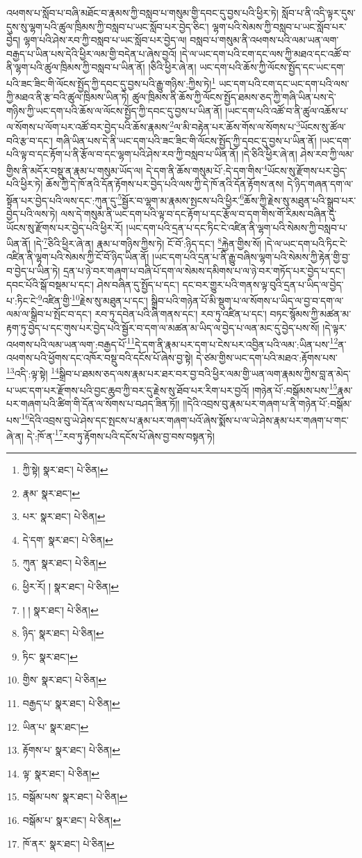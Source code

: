 འཕགས་པ་སློབ་པ་བཞི་མཐོང་བ་རྣམས་ཀྱི་བསླབ་པ་གསུམ་གྱི་དབང་དུ་བྱས་པའི་ཕྱིར་ཏེ། སློབ་པ་ནི་འདི་ལྟར་དུས་དུས་སུ་ལྷག་པའི་ཚུལ་ཁྲིམས་ཀྱི་བསླབ་པ་ཡང་སློབ་པར་བྱེད་ཅིང་། ལྷག་པའི་སེམས་ཀྱི་བསླབ་པ་ཡང་སློབ་པར་བྱེད། ལྷག་པའི་ཤེས་རབ་ཀྱི་བསླབ་པ་ཡང་སློབ་པར་བྱེད་ལ། བསླབ་པ་གསུམ་ནི་འཕགས་པའི་ལམ་ཡན་ལག་བརྒྱད་པ་ཡིན་པས་དེའི་ཕྱིར་ལམ་གྱི་བདེན་པ་ཞེས་བྱའོ། །དེ་ལ་ཡང་དག་པའི་ངག་དང་ལས་ཀྱི་མཐའ་དང་འཚོ་བ་ནི་ལྷག་པའི་ཚུལ་ཁྲིམས་ཀྱི་བསླབ་པ་ཡིན་ནོ། །ཅིའི་ཕྱིར་ཞེ་ན། ཡང་དག་པའི་ཆོས་ཀྱི་ལོངས་སྤྱོད་དང་ཡང་དག་པའི་ཟང་ཟིང་གི་ལོངས་སྤྱོད་ཀྱི་དབང་དུ་བྱས་པའི་རྒྱུ་གཉིས་:ཀྱིས་ཏེ།\footnote{ཀྱི་སྟེ།  སྣར་ཐང་།  པེ་ཅིན། } ཡང་དག་པའི་ངག་དང་ཡང་དག་པའི་ལས་ཀྱི་མཐའ་ནི་རྩ་བའི་ཚུལ་ཁྲིམས་ཡིན་ཏེ། ཚུལ་ཁྲིམས་ནི་ཆོས་ཀྱི་ལོངས་སྤྱོད་ཐམས་ཅད་ཀྱི་གཞི་ཡིན་པས་དེ་གཉིས་ཀྱི་ཡང་དག་པའི་ཆོས་ལ་ལོངས་སྤྱོད་ཀྱི་དབང་དུ་བྱས་པ་ཡིན་ནོ། །ཡང་དག་པའི་འཚོ་བ་ནི་ཚུལ་འཆོས་པ་ལ་སོགས་པ་ལོག་པར་འཚོ་བར་བྱེད་པའི་ཆོས་རྣམས་\footnote{རྣམ་  སྣར་ཐང་། }ལ་མི་བརྟེན་པར་ཆོས་གོས་ལ་སོགས་པ་\footnote{པར་  སྣར་ཐང་།  པེ་ཅིན། }ཡོངས་སུ་ཚོལ་བའི་རྩ་བ་དང་། གཞི་ཡིན་པས་དེ་ནི་ཡང་དག་པའི་ཟང་ཟིང་གི་ལོངས་སྤྱོད་ཀྱི་དབང་དུ་བྱས་པ་ཡིན་ནོ། །ཡང་དག་པའི་ལྟ་བ་དང་རྟོག་པ་ནི་རྩོལ་བ་དང་ལྷག་པའི་ཤེས་རབ་ཀྱི་བསླབ་པ་ཡིན་ནོ། །དེ་ཅིའི་ཕྱིར་ཞེ་ན། ཤེས་རབ་ཀྱི་ལམ་གྱིས་ནི་མདོར་བསྡུ་ན་རྣམ་པ་གསུམ་ཡོད་ལ། དེ་དག་ནི་ཆོས་གསུམ་པོ་:དེ་དག་གིས་\footnote{དེ་དག་  སྣར་ཐང་།  པེ་ཅིན། }ཡོངས་སུ་རྫོགས་པར་བྱེད་པའི་ཕྱིར་ཏེ། ཆོས་ཀྱི་དེ་ཁོ་ནའི་དོན་རྟོགས་པར་བྱེད་པའི་ལས་ཀྱི་དེ་ཁོ་ནའི་དོན་རྟོགས་ནས། དེ་ཉིད་གཞན་དག་ལ་སྟོན་པར་བྱེད་པའི་ལས་དང་:ཀུན་དུ་\footnote{ཀུན་  སྣར་ཐང་།  པེ་ཅིན། }སྦྱོར་བ་ལྷག་མ་རྣམས་སྤངས་པའི་ཕྱིར་\footnote{ཕྱིར་རོ། །  སྣར་ཐང་།  པེ་ཅིན། }ཆོས་ཀྱི་རྗེས་སུ་མཐུན་པའི་སྒྲུབ་པར་བྱེད་པའི་ལས་ཏེ། ལས་དེ་གསུམ་ནི་ཡང་དག་པའི་ལྟ་བ་དང་རྟོག་པ་དང་རྩོལ་བ་དག་གིས་གོ་རིམས་བཞིན་དུ་ཡོངས་སུ་རྫོགས་པར་བྱེད་པའི་ཕྱིར་རོ། །ཡང་དག་པའི་དྲན་པ་དང་ཏིང་ངེ་འཛིན་ནི་ལྷག་པའི་སེམས་ཀྱི་བསླབ་པ་ཡིན་ནོ། །དེ་\footnote{། །  སྣར་ཐང་།  པེ་ཅིན། }ཅིའི་ཕྱིར་ཞེ་ན། རྣམ་པ་གཉིས་ཀྱིས་ཏེ། ངོ་བོ་:ཉིད་དང་། \footnote{ཉིད་  སྣར་ཐང་།  པེ་ཅིན། }རྐྱེན་གྱིས་སོ། །དེ་ལ་ཡང་དག་པའི་ཏིང་ངེ་འཛིན་ནི་ལྷག་པའི་སེམས་ཀྱི་ངོ་བོ་ཉིད་ཡིན་ནོ། །ཡང་དག་པའི་དྲན་པ་ནི་རྒྱུ་བཞིས་ལྷག་པའི་སེམས་ཀྱི་རྟེན་གྱི་བྱ་བ་བྱེད་པ་ཡིན་ཏེ། དྲན་པ་ཉེ་བར་གཞག་པ་བཞི་པོ་དག་ལ་སེམས་དམིགས་པ་ལ་ཉེ་བར་གཏོད་པར་བྱེད་པ་དང་། དབང་པོའི་སྒོ་བསྡམ་པ་དང་། ཤེས་བཞིན་དུ་སྤྱོད་པ་དང་། དང་བར་གྱུར་པའི་གནས་ལྟ་བུའི་དྲན་པ་ཡིད་ལ་བྱེད་པ་:ཏིང་ངེ་\footnote{ཏིང་  སྣར་ཐང་། }འཛིན་གྱི་\footnote{གྱིས་  སྣར་ཐང་།  པེ་ཅིན། }རྗེས་སུ་མཐུན་པ་དང་། སྒྲིབ་པའི་གཉེན་པོ་མི་སྡུག་པ་ལ་སོགས་པ་ཡིད་ལ་བྱ་བ་དག་ལ་ལམ་ལ་སྒྲིབ་པ་སྤོང་བ་དང་། རབ་ཏུ་དབེན་པའི་ཞི་གནས་དང་། རབ་ཏུ་འཛིན་པ་དང་། བཏང་སྙོམས་ཀྱི་མཚན་མ་རྟག་ཏུ་བྱེད་པ་དང་གུས་པར་བྱེད་པའི་སྦྱོར་བ་དག་ལ་མཚན་མ་ཡིད་ལ་བྱེད་པ་ལན་མང་དུ་བྱེད་པས་སོ། །དེ་ལྟར་འཕགས་པའི་ལམ་ཡན་ལག་:བརྒྱད་པོ་\footnote{བརྒྱད་པ་  སྣར་ཐང་།  པེ་ཅིན། }དེ་དག་ནི་རྣམ་པར་དག་པ་ངེས་པར་འབྱིན་པའི་ལམ་:ཡིན་པས་\footnote{ཡིན་པ་  སྣར་ཐང་། }ན་འཕགས་པའི་ཕྱོགས་དང་འཁོར་བསྡུ་བའི་དངོས་པོ་ཞེས་བྱ་སྟེ། དེ་ཙམ་གྱིས་ཡང་དག་པའི་མཐའ་:རྟོགས་པས་\footnote{རྟོགས་པ་  སྣར་ཐང་།  པེ་ཅིན། }འདི་:ལྟ་སྟེ། \footnote{ལྟ་  སྣར་ཐང་།  པེ་ཅིན། }སྒྲིབ་པ་ཐམས་ཅད་ལས་རྣམ་པར་ཐར་བར་བྱ་བའི་ཕྱིར་ལམ་གྱི་ཡན་ལག་རྣམས་ཀྱིས་བླ་ན་མེད་པ་ཡང་དག་པར་རྫོགས་པའི་བྱང་ཆུབ་ཀྱི་བར་དུ་རྗེས་སུ་ཐོབ་པར་རིག་པར་བྱའོ། །གཉེན་པོ་:བསྒོམས་པས་\footnote{བསྒོམ་པས་  སྣར་ཐང་།  པེ་ཅིན། }རྣམ་པར་གཞག་པའི་ཚིག་གི་དོན་ལ་སོགས་པ་བཤད་ཟིན་ཏོ།། །།དེའི་འབྲས་བུ་རྣམ་པར་གཞག་པ་ནི་གཉེན་པོ་:བསྒོམ་པས་\footnote{བསྒོམ་པ་  སྣར་ཐང་།  པེ་ཅིན། }དེའི་འབྲས་བུ་ཡེ་ཤེས་དང་སྤངས་པ་རྣམ་པར་གཞག་པའོ་ཞེས་སྨོས་པ་ལ་ཡེ་ཤེས་རྣམ་པར་གཞག་པ་གང་ཞེ་ན། དེ་:ཁོ་ན་\footnote{ཁོ་ནར་  སྣར་ཐང་།  པེ་ཅིན། }རབ་ཏུ་རྟོགས་པའི་དངོས་པོ་ཞེས་བྱ་བས་བསྟན་ཏེ། 